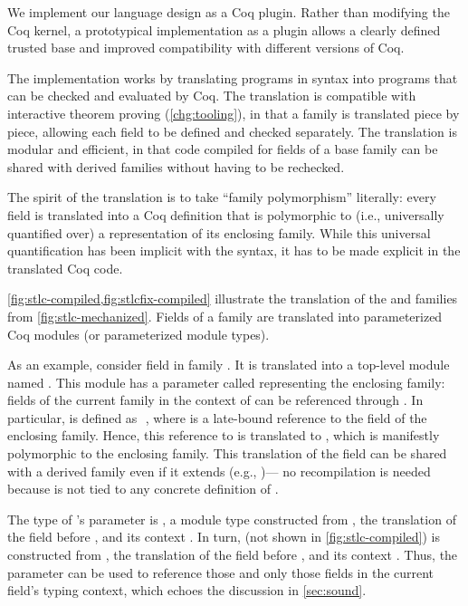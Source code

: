 We implement our language design as a Coq plugin.
Rather than modifying the Coq kernel, a prototypical implementation as a
plugin allows a clearly defined trusted base and
improved compatibility with different versions of Coq.

The implementation works by translating programs in \Lang syntax into
programs that can be checked and evaluated by Coq.
The translation is compatible with interactive theorem proving (\ref{chg:tooling}), in that
a family is translated piece by piece, allowing each field to be defined
and checked separately.
The translation is modular and efficient, in that
code compiled for fields of a base family
can be shared with derived families without having to be rechecked.


The spirit of the translation is to take ``family polymorphism''
literally: every field is translated into a Coq definition that is
polymorphic to (i.e., universally quantified over) a representation of
its enclosing family.
While this universal quantification has been implicit with the \Lang
syntax, it has to be made explicit in the translated Coq code.

\cref{fig:stlc-compiled,fig:stlcfix-compiled} illustrate the translation of the
 and  families from \cref{fig:stlc-mechanized}.
Fields of a family are translated into parameterized Coq modules
(or parameterized module types).

As an example,
consider field  in family .
It is translated into a top-level module named .
This module has a parameter called  representing the enclosing
family: fields of the current family in the context of  can be
referenced through .
In particular,  is defined as \,\lsti{->}\,,
where  is a late-bound reference to the  field of the
enclosing family.
Hence, this reference to  is translated to ,
which is manifestly polymorphic to the enclosing family.
This translation of the  field can be shared
with a derived family even if it extends  (e.g., )---%
no recompilation is needed because  is not tied to any
concrete definition of .

The type of 's  parameter is ,
a module type constructed from , 
the translation of the field before ,
and its context .
In turn,  (not shown in \cref{fig:stlc-compiled}) is
constructed from ,
the translation of the field before ,
and its context .
Thus, the  parameter can be used to reference those and only
those fields in the current field's typing context, which echoes the
discussion in \cref{sec:sound}.

